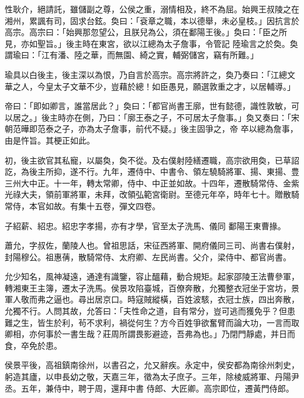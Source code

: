 \begin{pinyinscope}
 性耿介，絕請託，雖儲副之尊，公侯之重，溺情相及，終不為屈。始興王叔陵之在湘州，累諷有司，固求台鉉。奐曰：「袞章之職，本以德舉，未必皇枝。」因抗言於高宗。高宗曰：「始興那忽望公，且朕兒為公，須在鄱陽王後。」奐曰：「臣之所見，亦如聖旨。」後主時在東宮，欲以江總為太子詹事，令管記
 陸瑜言之於奐。奐謂瑜曰：「江有潘、陸之華，而無園、綺之實，輔弼儲宮，竊有所難。」



 瑜具以白後主，後主深以為恨，乃自言於高宗。高宗將許之，奐乃奏曰：「江總文華之人，今皇太子文華不少，豈藉於總！如臣愚見，願選敦重之才，以居輔導。」



 帝曰：「即如卿言，誰當居此？」奐曰：「都官尚書王廓，世有懿德，識性敦敏，可以居之。」後主時亦在側，乃曰：「廓王泰之子，不可居太子詹事。」奐又奏曰：「宋朝范曄即范泰之子，亦為太子詹事，前代不疑。」後主固爭之，帝
 卒以總為詹事，由是忤旨。其梗正如此。



 初，後主欲官其私寵，以屬奐，奐不從。及右僕射陸繕遷職，高宗欲用奐，已草詔訖，為後主所抑，遂不行。九年，遷侍中、中書令、領左驍騎將軍、揚、東揚、豊三州大中正。十一年，轉太常卿，侍中、中正並如故。十四年，遷散騎常侍、金紫光祿大夫，領前軍將軍，未拜，改領弘範宮衛尉。至德元年卒，時年七十。贈散騎常侍，本官如故。有集十五卷，彈文四卷。



 子紹薪、紹忠。紹忠字孝揚，亦有才學，官至太子洗馬、儀同
 鄱陽王東曹掾。



 蕭允，字叔佐，蘭陵人也。曾祖思話，宋征西將軍、開府儀同三司、尚書右僕射，封陽穆公。祖惠蒨，散騎常侍、太府卿、左民尚書。父介，梁侍中、都官尚書。



 允少知名，風神凝遠，通達有識鑒，容止醞藉，動合規矩。起家邵陵王法曹參軍，轉湘東王主簿，遷太子洗馬。侯景攻陷臺城，百僚奔散，允獨整衣冠坐于宮坊，景軍人敬而弗之逼也。尋出居京口。時寇賊縱橫，百姓波駭，衣冠士族，四出奔散，
 允獨不行。人問其故，允答曰：「夫性命之道，自有常分，豈可逃而獲免乎？但患難之生，皆生於利，茍不求利，禍從何生？方今百姓爭欲奮臂而論大功，一言而取卿相，亦何事於一書生哉？莊周所謂畏影避迹，吾弗為也。」乃閉門靜處，并日而食，卒免於患。



 侯景平後，高祖鎮南徐州，以書召之，允又辭疾。永定中，侯安都為南徐州刺史，躬造其廬，以申長幼之敬，天嘉三年，徵為太子庶子。三年，除棱威將軍、丹陽尹丞。五年，兼侍中，聘于周，還拜中書
 侍郎、大匠卿。高宗即位，遷黃門侍郎。




\end{pinyinscope}
